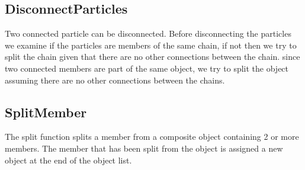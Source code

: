 \documentclass[12pt]{report}
\begin{document}
\subsection{DisconnectParticles}
Two connected particle can be disconnected. Before disconnecting the particles we examine if the particles are members of the same chain, if not then we try to split the chain given that there are no other connections between the chain.
since two connected members are part of the same object, we try to split the object assuming there are no other connections between the chains.

\subsection{SplitMember}
The split function splits a member from a composite object containing 2 or more members. The member that has been split from the object is assigned a new object at the end of the object list.  
\end{document}
